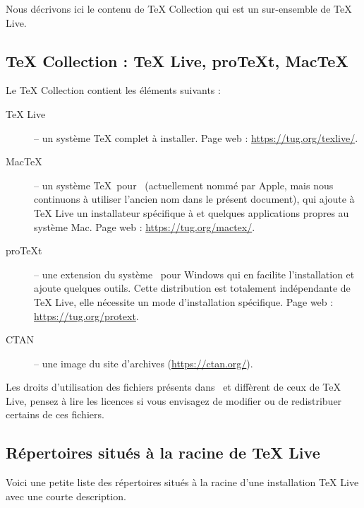 \documentclass[german, english, french]{article}
\renewcommand{\TL}{\TeX{} Live\xspace}%
\renewcommand{\TK}{\TeX{} Collection\xspace}%
\begin{document}
Nous décrivons ici le contenu de \TK{} qui est un sur-ensemble de \TL.

\subsection {\protect\TK{} : \protect\TL, pro\protect\TeX{}t, Mac\protect\TeX}
\label{sec:tl-coll-dists}

Le \DVD{} \TK{} contient les éléments suivants :

\begin{description}

\item[\TL{}] -- un système \TeX{} complet à installer. Page web :
  \url{https://tug.org/texlive/}.

\item[Mac\TeX] -- un système \TeX\ pour \MacOSX\ (actuellement nommé par Apple,
  mais nous continuons à utiliser l'ancien nom dans le présent document), qui
  ajoute à \TL un installateur spécifique à \MacOSX{} et quelques applications
  propres au système Mac.  Page web : \url{https://tug.org/mactex/}.

\item[pro\TeX{}t] -- une extension du système \MIKTEX\ pour Windows qui en
  facilite l'installation et ajoute quelques outils. Cette distribution est
  totalement indépendante de \TL{}, elle nécessite un mode d'installation
  spécifique.  Page web : \url{https://tug.org/protext}.

\item[CTAN] -- une image du site d'archives \CTAN (\url{https://ctan.org/}).

\end{description}

Les droits d'utilisation des fichiers présents dans \CTAN\ et \ProTeXt{}
diffèrent de ceux de \TL{}, pensez à lire les licences si vous envisagez de
modifier ou de redistribuer certains de ces fichiers.

\subsection{Répertoires situés à la racine de \protect\TL{}}
\label{sec:tld}

Voici une petite liste des répertoires situés à la racine d'une installation \TL
avec une courte description.
\end{document}
